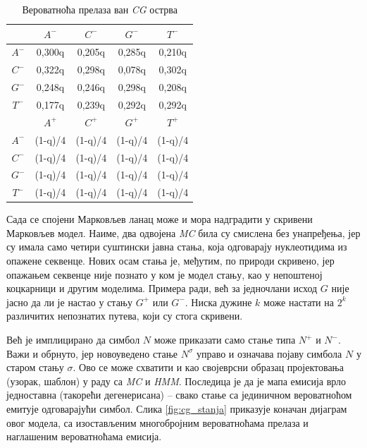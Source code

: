 \documentclass[12pt,oneside]{memoir}
\begin{document}
\begin{CJK}{UTF8}{ipxm}
\begin{table}[h!]
  \centering
  \caption{Вероватноћа прелаза ван \textit{CG} острва}
  \begin{tabular}{| c | c c c c |} \hline
   & $A^-$ & $C^-$ & $G^-$ & $T^-$ \\ \hline
  $A^-$ & 0,300q & 0,205q & 0,285q & 0,210q \\
  $C^-$ & 0,322q & 0,298q & 0,078q & 0,302q \\
  $G^-$ & 0,248q & 0,246q & 0,298q & 0,208q \\
  $T^-$ & 0,177q & 0,239q & 0,292q & 0,292q \\ \hhline{= | = = = =}
   & $A^+$ & $C^+$ & $G^+$ & $T^+$ \\ \hline
  $A^-$ & (1-q)/4 & (1-q)/4 & (1-q)/4 & (1-q)/4 \\
  $C^-$ & (1-q)/4 & (1-q)/4 & (1-q)/4 & (1-q)/4 \\
  $G^-$ & (1-q)/4 & (1-q)/4 & (1-q)/4 & (1-q)/4 \\
  $T^-$ & (1-q)/4 & (1-q)/4 & (1-q)/4 & (1-q)/4 \\ \hline
  \end{tabular}
  \label{tab:cg_hmm2}
\end{table}

Сада се спојени Марковљев ланац може и мора надградити у скривени Марковљев модел. Наиме, два одвојена \textit{MC} била су смислена без унапређења, јер су имала само четири суштински јавна стања, која одговарају нуклеотидима из опажене секвенце. Нових осам стања је, међутим, по природи скривено, јер опажањем секвенце није познато у ком је модел стању, као у непоштеној коцкарници и другим моделима. Примера ради, већ за једночлани исход $G$ није јасно да ли је настао у стању $G^+$ или $G^-$. Ниска дужине $k$ може настати на $2^k$ различитих непознатих путева, који су стога скривени.

Већ је имплицирано да симбол $N$ може приказати само стање типа $N^+$ и $N^-$. Важи и обрнуто, јер новоуведено стање $N^\sigma$ управо и означава појаву симбола $N$ у старом стању $\sigma$. Ово се може схватити и као својеврсни образац пројектовања (узорак, шаблон) у раду са \textit{MC} и \textit{HMM}. Последица је да је мапа емисија врло једноставна (такорећи дегенерисана) -- свако стање са јединичном вероватноћом емитује одговарајући симбол. Слика \ref{fig:cg_stanja} приказује коначан дијаграм овог модела, са изостављеним многобројним вероватноћама прелаза и наглашеним вероватноћама емисија.


\end{CJK}
\end{document}
